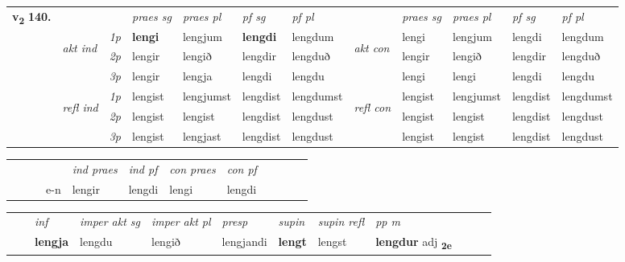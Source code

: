 \begin{tabular}{llllllllllll} \toprule
\multirow{4}{*}{{{\textbf{v{\textsubscript{2}}} \Large{\textbf{140.}}}}}  & &   &  \textit{praes sg}  & \textit{praes pl}  &\textit{ pf sg} & \textit{pf pl} &  &  \textit{praes sg}  & \textit{praes pl}  & \textit{pf sg} & \textit{pf pl } \\*
	\cmidrule{4-7} \cmidrule{9-12}
 & \multirow{3}{*}{\begin{turn}{90}\textit{akt ind}\end{turn}} & {\textit{1p}} & \textbf{lengi} & lengjum    & \textbf{lengdi} & lengdum & \multirow{3}{*}{\begin{turn}{90}\textit{akt con}\end{turn}} &lengi & lengjum & lengdi & lengdum\\*
& &  {\textit{2p}} &  lengir  & lengið   & lengdir & lengduð & & lengir & lengið & lengdir & lengduð \\*
& &  {\textit{3p}} & lengir & lengja   & lengdi & lengdu & & lengi & lengi& lengdi & lengdu  \\*
\cmidrule{4-7} \cmidrule{9-12}
 &\multirow{3}{*}{\begin{turn}{90}\textit{refl ind}\end{turn}} & {\textit{1p}} & lengist & lengjumst    & lengdist & lengdumst & \multirow{3}{*}{\begin{turn}{90}\textit{refl con}\end{turn}}  &lengist & lengjumst & lengdist & lengdumst\\*
 &&  {\textit{2p}} &  lengist  & lengist   & lengdist & lengdust & &lengist & lengist & lengdist & lengdust \\*
& &  {\textit{3p}} & lengist & lengjast   & lengdist & lengdust & & lengist & lengist& lengdist & lengdust  \\*
\cmidrule{4-7} \cmidrule{9-12}
\end{tabular}


\begin{tabular}{llllllllllll}
 & &  & &  \textit{ind praes} & \textit{ind pf} & \textit{con praes} & \textit{con pf} \\*
&  & & e-n & lengir & lengdi & lengi & lengdi \\*
\cmidrule{5-9}
\end{tabular}


\begin{tabular}{llllllllllll}
 & & \textit{inf} & \textit{imper akt sg} & \textit{imper akt pl}   & \textit{presp} & \textit{supin} & \textit{supin refl} & \textit{pp m}     \\*
  & & \textbf{lengja} & lengdu  & lengið   & lengjandi &  \textbf{lengt} & lengst & \textbf{lengdur} adj \textbf{\textsubscript{2e}} \\*
\cmidrule{1-12}
\end{tabular}




